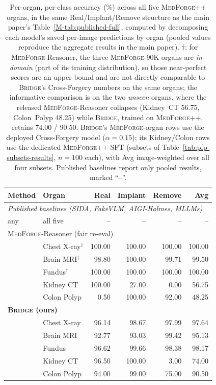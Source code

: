 \documentclass[10pt,twocolumn,letterpaper]{article}
\newcommand{\bridge}{\textsc{Bridge}}
\newcommand{\medforge}{\textsc{MedForge}}
\newcommand{\medforgepp}{\textsc{MedForge++}}
\begin{document}
\begin{table}[h]
\centering
\small
\begin{tabular}{llrrrr}
\toprule
Method & Organ & Real & Implant & Remove & Avg \\
\midrule
\multicolumn{6}{l}{\textit{Published baselines (SIDA, FakeVLM, AIGI-Holmes, MLLMs)}} \\
\quad any & all five & -- & -- & -- & -- \\
\midrule
\multicolumn{6}{l}{\medforge{}-Reasoner (fair re-eval)} \\
 & Chest X-ray$^\dagger$ & 100.00 & 100.00 & 100.00 & 100.00 \\
 & Brain MRI$^\dagger$ & 98.80 & 100.00 & 99.71 & 99.50 \\
 & Fundus$^\dagger$ & 100.00 & 100.00 & 100.00 & 100.00 \\
 & Kidney CT & 100.00 & 27.00 & 0.00 & 56.75 \\
 & Colon Polyp & 0.50 & 100.00 & 92.00 & 48.25 \\
\midrule
\multicolumn{6}{l}{\textbf{\bridge{} (ours)}} \\
 & Chest X-ray & 96.14 & 98.67 & 97.99 & 97.64 \\
 & Brain MRI & 92.77 & 93.03 & 99.42 & 95.13 \\
 & Fundus & 96.62 & 99.66 & 98.38 & 98.17 \\
 & Kidney CT & 96.50 & 100.00 & 3.00 & 74.00 \\
 & Colon Polyp & 94.00 & 99.00 & 75.00 & 90.50 \\
\bottomrule
\end{tabular}
\caption{Per-organ, per-class accuracy (\%) across all five \medforgepp{} organs, in the same Real/Implant/Remove structure as the main paper's Table~\ref{M-tab:published-full}, computed by decomposing each model's saved per-image predictions by organ (pooled values reproduce the aggregate results in the main paper). $\dagger$: for \medforge{}-Reasoner, the three \medforge{}-90K organs are \emph{in-domain} (part of its training distribution), so those near-perfect scores are an upper bound and are not directly comparable to \bridge{}'s Cross-Forgery numbers on the same organs; the informative comparison is on the two \emph{unseen} organs, where the released \medforge{}-Reasoner collapses (Kidney~CT 56.75, Colon~Polyp 48.25) while \bridge{}, trained on \medforgepp{}, retains 74.00 / 90.50. \bridge{}'s \medforge{}-organ rows use the deployed Cross-Forgery model ($\alpha{=}0.15$); its Kidney/Colon rows use the dedicated \medforgepp{} SFT (subsets of Table~\ref{tab:pfp-subsets-results}, $n{=}100$ each), with Avg image-weighted over all four subsets. Published baselines report only pooled results, marked ``--''.}
\label{tab:per-organ-five}
\end{table}
\end{document}
